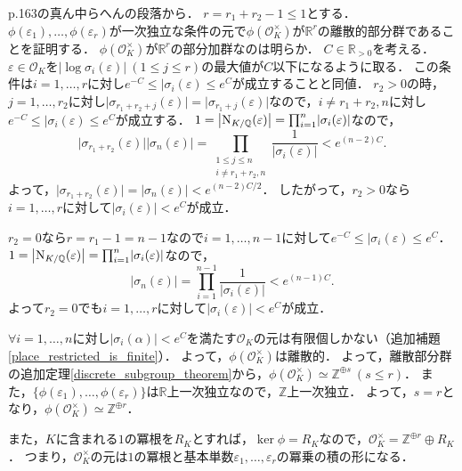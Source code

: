 p.163の真ん中らへんの段落から．
$r=r_1+r_2-1\leq1$とする．
$\phi(\varepsilon_1),\ldots,\phi(\varepsilon_r)$が一次独立な条件の元で$\phi(\mathcal{O}_K^\times)$が$\mathbb{R}^r$の離散的部分群であることを証明する．
$\phi(\mathcal{O}_K^\times)$が$\mathbb{R}^r$の部分加群なのは明らか．
$C\in\mathbb{R}_{>0}$を考える．$\varepsilon\in\mathcal{O}_K$を$\lvert\log\sigma_i(\varepsilon)\rvert\ (1\leq j\leq r)$の最大値が$C$以下になるように取る．
この条件は$i=1,\ldots,r$に対し$e^{-C}\leq\lvert\sigma_i(\varepsilon)\leq e^C$が成立することと同値．
$r_2>0$の時，$j=1,\ldots,r_2$に対し$\lvert\sigma_{r_1+r_2+j}(\varepsilon)\rvert=\lvert\sigma_{r_1+j}(\varepsilon)\rvert$なので，$i\neq r_1+r_2,n$に対し$e^{-C}\leq\lvert\sigma_i(\varepsilon)\leq e^C$が成立する．
$1=\left\lvert\operatorname{N}_{K/\mathbb{Q}}(\varepsilon)\right\rvert=\prod_{i=1}^n\lvert\sigma_i(\varepsilon)\rvert$なので，
\[\lvert\sigma_{r_1+r_2}(\varepsilon)\rvert\lvert\sigma_n(\varepsilon)\rvert=\prod_{\substack{1\leq j\leq n\\ i\neq r_1+r_2,n}}\frac{1}{\lvert\sigma_i(\varepsilon)\rvert}< e^{(n-2)C}.\]
よって，$\lvert\sigma_{r_1+r_2}(\varepsilon)\rvert=\lvert\sigma_n(\varepsilon)\rvert< e^{(n-2)C/2}$．
したがって，$r_2>0$なら$i=1,\ldots,r$に対して$\lvert\sigma_i(\varepsilon)\rvert< e^{C}$が成立．

$r_2=0$なら$r=r_1-1=n-1$なので$i=1,\ldots,n-1$に対して$e^{-C}\leq\lvert\sigma_i(\varepsilon)\leq e^C$．
$1=\left\lvert\operatorname{N}_{K/\mathbb{Q}}(\varepsilon)\right\rvert=\prod_{i=1}^n\lvert\sigma_i(\varepsilon)\rvert$なので，
\[\lvert\sigma_n(\varepsilon)\rvert=\prod_{i=1}^{n-1}\frac{1}{\lvert\sigma_i(\varepsilon)\rvert}< e^{(n-1)C}.\]
よって$r_2=0$でも$i=1,\ldots,r$に対して$\lvert\sigma_i(\varepsilon)\rvert< e^{C}$が成立．

$\forall i=1,\ldots,n$に対し$\lvert\sigma_i(\alpha)\rvert< e^C$を満たす$\mathcal{O}_K$の元は有限個しかない（追加補題\ref{place_restricted_is_finite}）．
よって，$\phi(\mathcal{O}_K^\times)$は離散的．
よって，離散部分群の追加定理\ref{discrete_subgroup_theorem}から，$\phi(\mathcal{O}_K^\times)\simeq\mathbb{Z}^{\oplus s}\ (s\leq r)$．
また，$\{\phi(\varepsilon_1),\ldots,\phi(\varepsilon_r)\}$は$\mathbb{R}$上一次独立なので，$\mathbb{Z}$上一次独立．
よって，$s=r$となり，$\phi(\mathcal{O}_K^\times)\simeq\mathbb{Z}^{\oplus r}$．

また，$K$に含まれる$1$の冪根を$R_K$とすれば，$\ker\phi=R_K$なので，$\mathcal{O}_K^\times=\mathbb{Z}^{\oplus r}\oplus R_K$．
つまり，$\mathcal{O}_K^\times$の元は$1$の冪根と基本単数$\varepsilon_1,\ldots,\varepsilon_r$の冪乗の積の形になる．


